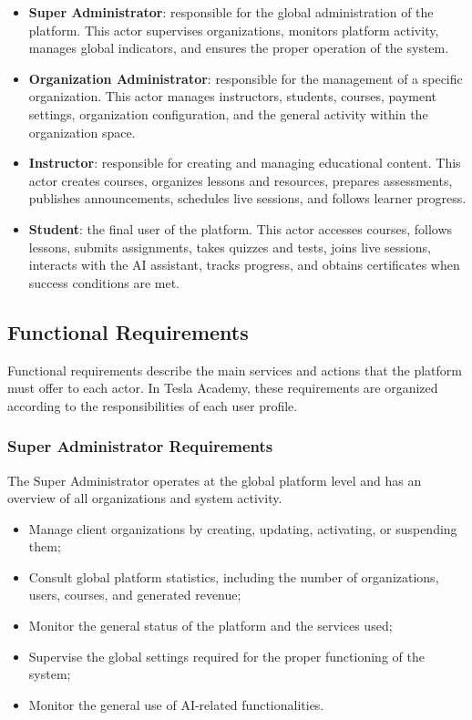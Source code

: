 \begin{itemize}

  \item \textbf{Super Administrator}: responsible for the global administration of the
        platform. This actor supervises organizations, monitors platform activity, manages
        global indicators, and ensures the proper operation of the system.

  \item \textbf{Organization Administrator}: responsible for the management of a specific
        organization. This actor manages instructors, students, courses, payment settings,
        organization configuration, and the general activity within the organization space.

  \item \textbf{Instructor}: responsible for creating and managing educational content.
        This actor creates courses, organizes lessons and resources, prepares assessments,
        publishes announcements, schedules live sessions, and follows learner progress.

  \item \textbf{Student}: the final user of the platform. This actor accesses courses,
        follows lessons, submits assignments, takes quizzes and tests, joins live sessions,
        interacts with the AI assistant, tracks progress, and obtains certificates when
        success conditions are met.

\end{itemize}

\subsection{Functional Requirements}

Functional requirements describe the main services and actions that the platform must offer
to each actor. In Tesla Academy, these requirements are organized according to the
responsibilities of each user profile.

\subsubsection{Super Administrator Requirements}

The Super Administrator operates at the global platform level and has an overview of all
organizations and system activity.

\begin{itemize}
  \item Manage client organizations by creating, updating, activating, or suspending them;
  \item Consult global platform statistics, including the number of organizations, users,
        courses, and generated revenue;
  \item Monitor the general status of the platform and the services used;
  \item Supervise the global settings required for the proper functioning of the system;
  \item Monitor the general use of AI-related functionalities.
\end{itemize}

